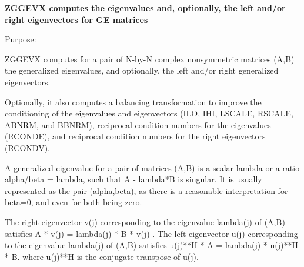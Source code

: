 {\bfseries  Z\+G\+G\+E\+V\+X computes the eigenvalues and, optionally, the left and/or right eigenvectors for G\+E matrices} 

 \begin{DoxyParagraph}{Purpose\+: }
\begin{DoxyVerb} ZGGEVX computes for a pair of N-by-N complex nonsymmetric matrices
 (A,B) the generalized eigenvalues, and optionally, the left and/or
 right generalized eigenvectors.

 Optionally, it also computes a balancing transformation to improve
 the conditioning of the eigenvalues and eigenvectors (ILO, IHI,
 LSCALE, RSCALE, ABNRM, and BBNRM), reciprocal condition numbers for
 the eigenvalues (RCONDE), and reciprocal condition numbers for the
 right eigenvectors (RCONDV).

 A generalized eigenvalue for a pair of matrices (A,B) is a scalar
 lambda or a ratio alpha/beta = lambda, such that A - lambda*B is
 singular. It is usually represented as the pair (alpha,beta), as
 there is a reasonable interpretation for beta=0, and even for both
 being zero.

 The right eigenvector v(j) corresponding to the eigenvalue lambda(j)
 of (A,B) satisfies
                  A * v(j) = lambda(j) * B * v(j) .
 The left eigenvector u(j) corresponding to the eigenvalue lambda(j)
 of (A,B) satisfies
                  u(j)**H * A  = lambda(j) * u(j)**H * B.
 where u(j)**H is the conjugate-transpose of u(j).\end{DoxyVerb}
 
\end{DoxyParagraph}

